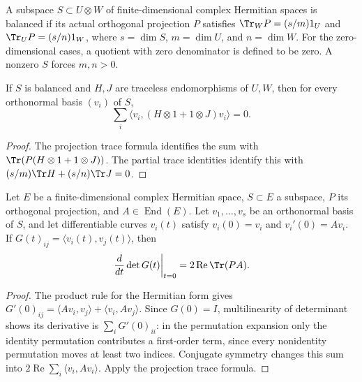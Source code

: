 \begin{definition}
\label{def:balanced-subspace}
\leanok
A subspace $S\subset U\otimes W$ of finite-dimensional complex
Hermitian spaces is balanced if its actual orthogonal projection $P$
satisfies $\Tr_WP=(s/m)1_U$ and $\Tr_UP=(s/n)1_W$, where
$s=\dim S$, $m=\dim U$, and $n=\dim W$.
For the zero-dimensional cases, a quotient with zero denominator is
defined to be zero. A nonzero $S$ forces $m,n>0$.
\end{definition}

\begin{lemma}
\label{lem:balanced-frame-sum}
\leanok
If $S$ is balanced and $H,J$ are traceless endomorphisms of $U,W$,
then for every orthonormal basis $(v_i)$ of $S$,
\[
 \sum_i\langle v_i,(H\otimes1+1\otimes J)v_i\rangle=0.
\]
\end{lemma}
\begin{proof}
The projection trace formula identifies the sum with
$\Tr(P(H\otimes1+1\otimes J))$.
The partial trace identities identify this with
$(s/m)\Tr H+(s/n)\Tr J=0$.
\end{proof}

\begin{lemma}
\label{lem:balanced-gram-variation}
\leanok
Let $E$ be a finite-dimensional complex Hermitian space, $S\subset E$
a subspace, $P$ its orthogonal projection, and $A\in\operatorname{End}(E)$.
Let $v_1,\ldots,v_s$ be an orthonormal basis of $S$,
and let differentiable curves $v_i(t)$ satisfy $v_i(0)=v_i$ and
$v_i'(0)=Av_i$. If $G(t)_{ij}=\langle v_i(t),v_j(t)\rangle$, then
\[
 \left.\frac{d}{dt}\det G(t)\right|_{t=0}=2\operatorname{Re}\Tr(PA).
\]
\end{lemma}
\begin{proof}
The product rule for the Hermitian form gives
$G'(0)_{ij}=\langle Av_i,v_j\rangle+\langle v_i,Av_j\rangle$.
Since $G(0)=I$, multilinearity of determinant shows its derivative
is $\sum_iG'(0)_{ii}$: in the permutation expansion only the identity
permutation contributes a first-order term, since every nonidentity
permutation moves at least two indices. Conjugate symmetry changes this
sum into $2\operatorname{Re}\sum_i\langle v_i,Av_i\rangle$.
Apply the projection trace formula.
\end{proof}


